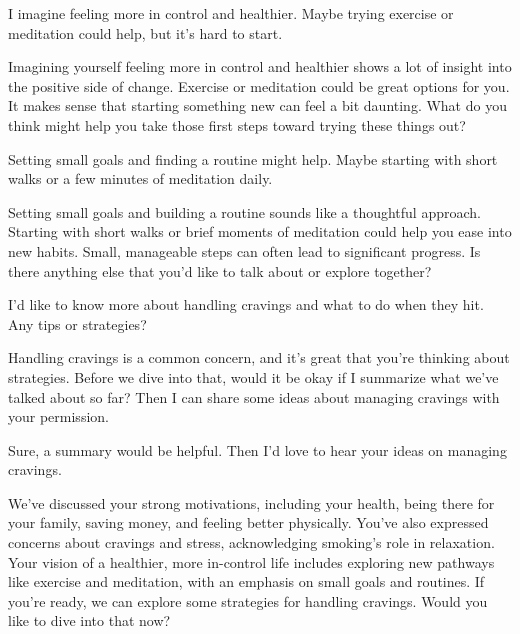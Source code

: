 \begin{clientbox}
I imagine feeling more in control and healthier. Maybe trying exercise or meditation could help, but it's hard to start.
\end{clientbox}

\begin{counsellorbox}
Imagining yourself feeling more in control and healthier shows a lot of insight into the positive side of change. Exercise or meditation could be great options for you. It makes sense that starting something new can feel a bit daunting. What do you think might help you take those first steps toward trying these things out?
\end{counsellorbox}

\begin{clientbox}
Setting small goals and finding a routine might help. Maybe starting with short walks or a few minutes of meditation daily.
\end{clientbox}

\begin{counsellorbox}
Setting small goals and building a routine sounds like a thoughtful approach. Starting with short walks or brief moments of meditation could help you ease into new habits. Small, manageable steps can often lead to significant progress. Is there anything else that you’d like to talk about or explore together?
\end{counsellorbox}

\begin{clientbox}
I'd like to know more about handling cravings and what to do when they hit. Any tips or strategies?
\end{clientbox}

\begin{counsellorbox}
Handling cravings is a common concern, and it's great that you're thinking about strategies. Before we dive into that, would it be okay if I summarize what we've talked about so far? Then I can share some ideas about managing cravings with your permission.
\end{counsellorbox}

\begin{clientbox}
Sure, a summary would be helpful. Then I'd love to hear your ideas on managing cravings.
\end{clientbox}

\begin{counsellorbox}
We've discussed your strong motivations, including your health, being there for your family, saving money, and feeling better physically. You've also expressed concerns about cravings and stress, acknowledging smoking's role in relaxation. Your vision of a healthier, more in-control life includes exploring new pathways like exercise and meditation, with an emphasis on small goals and routines. If you're ready, we can explore some strategies for handling cravings. Would you like to dive into that now?
\end{counsellorbox}

